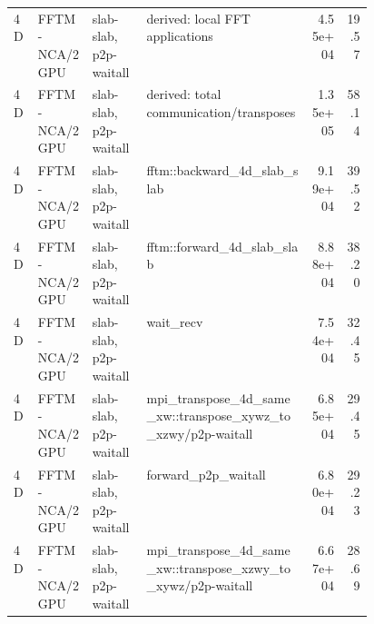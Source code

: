 \documentclass{article}
\begin{document}
\begin{center}
{\begin{tabular}{lll p{0.46\linewidth} rr}
4D & FFTM-NCA/2GPU & slab-slab, p2p-waitall & derived: local FFT applications & 4.55e+04 & 19.57 \\
4D & FFTM-NCA/2GPU & slab-slab, p2p-waitall & derived: total communication/transposes & 1.35e+05 & 58.14 \\
4D & FFTM-NCA/2GPU & slab-slab, p2p-waitall & fftm::backward\_4d\_slab\_slab & 9.19e+04 & 39.52 \\
4D & FFTM-NCA/2GPU & slab-slab, p2p-waitall & fftm::forward\_4d\_slab\_slab & 8.88e+04 & 38.20 \\
4D & FFTM-NCA/2GPU & slab-slab, p2p-waitall & wait\_recv & 7.54e+04 & 32.45 \\
4D & FFTM-NCA/2GPU & slab-slab, p2p-waitall & mpi\_transpose\_4d\_same\_xw::transpose\_xywz\_to\_xzwy/p2p-waitall & 6.85e+04 & 29.45 \\
4D & FFTM-NCA/2GPU & slab-slab, p2p-waitall & forward\_p2p\_waitall & 6.80e+04 & 29.23 \\
4D & FFTM-NCA/2GPU & slab-slab, p2p-waitall & mpi\_transpose\_4d\_same\_xw::transpose\_xzwy\_to\_xywz/p2p-waitall & 6.67e+04 & 28.69 \\
\hline
\end{tabular}
}
\end{center}
\end{document}
